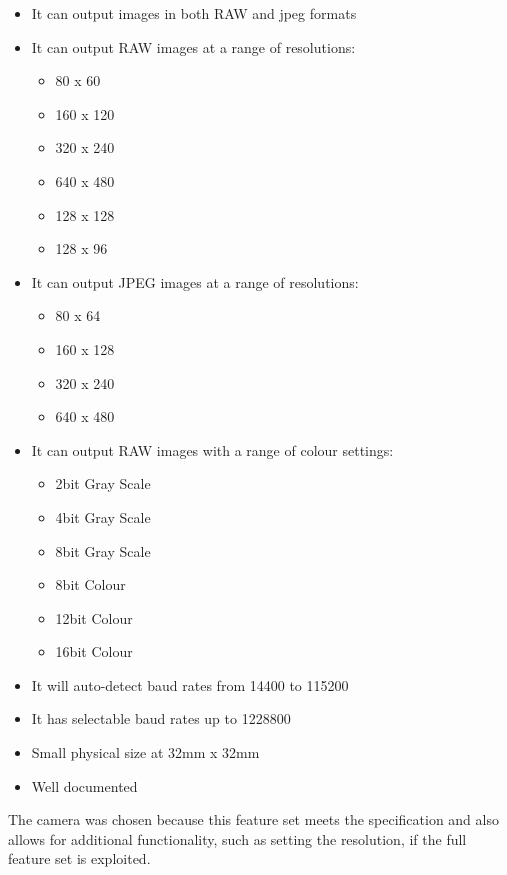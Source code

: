 	\begin{itemize}
		\item It can output images in both RAW and jpeg formats
		\item It can output RAW images at a range of resolutions:
		\begin{itemize}
			\item 80 x 60
			\item 160 x 120
			\item 320 x 240
			\item 640 x 480
			\item 128 x 128
			\item 128 x 96
		\end{itemize}
		\item It can output JPEG images at a range of resolutions:
		\begin{itemize}
			\item 80 x 64
			\item 160 x 128
			\item 320 x 240
			\item 640 x 480
		\end{itemize}
		\item It can output RAW images with a range of colour settings:
		\begin{itemize}
			\item 2bit Gray Scale
			\item 4bit Gray Scale
			\item 8bit Gray Scale
			\item 8bit Colour
			\item 12bit Colour
			\item 16bit Colour
		\end{itemize}
		\item It will auto-detect baud rates from 14400 to 115200
		\item It has selectable baud rates up to 1228800
		\item Small physical size at 32mm x 32mm
		\item Well documented
	\end{itemize}

The camera was chosen because this feature set meets the specification and also allows for additional functionality, such as setting the resolution, if the full feature set is exploited.